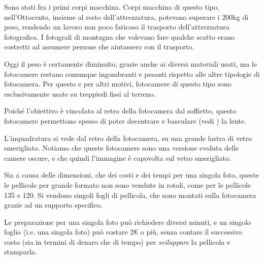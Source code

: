 Sono stati fra i primi corpi macchina. Corpi macchina di questo tipo, nell'Ottocento, insieme al resto dell'attrezzatura, potevano superare i 200kg di peso, rendendo un lavoro non poco faticoso il trasporto dell'attrezzatura fotografica.
I fotografi di montagna che volevano fare qualche scatto erano costretti ad assumere persone che aiutassero con il trasporto.

Oggi il peso è certamente diminuito, grazie anche ai diversi materiali usati, ma le fotocamere restano comunque ingombranti e pesanti rispetto alle altre tipologie di fotocamera.
Per questo e per altri motivi, fotocamere di questo tipo sono esclusivamente usate su treppiedi fissi al terreno.

Poiché l'obiettivo è vincolato al retro della fotocamera dal soffietto, questo fotocamere permettono spesso di poter decentrare e basculare (vedi ) la lente.

L'inquadratura si vede dal retro della fotocamera, su una grande lastra di vetro smerigliato. Notiamo che queste fotocamere sono una versione evoluta delle camere oscure, e che quindi l'immagine è capovolta sul vetro smerigliato.

Sia a causa delle dimensioni, che dei costi e dei tempi per una singola foto, queste le pellicole per grande formato non sono vendute in rotoli, come per le pellicole 135 e 120.
Si vendono singoli fogli di pellicola, che sono montati sulla fotocamera grazie ad un supporto specifico.

Le preparazione per una singola foto può richiedere diversi minuti, e un singolo foglio (i.e. una singola foto) può costare 2$\euro$ o più, senza contare il successivo costo (sia in termini di denaro che di tempo) per \textit{sviluppare} la pellicola e stamparla.